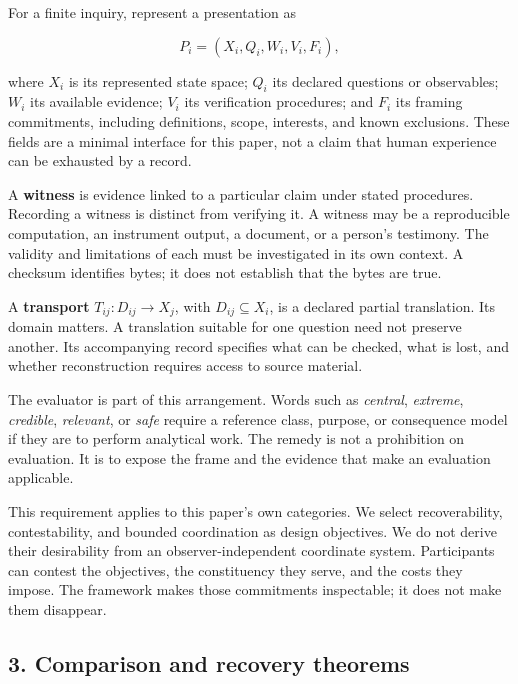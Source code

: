 \documentclass[
  10pt,
]{article}
\begin{document}
For a finite inquiry, represent a presentation as

\protect\hypertarget{math-E0005-0005}{}{\[
P_i=(X_i,Q_i,W_i,V_i,F_i),
\]}

where \protect\hypertarget{math-E0006-0006}{}{\(X_i\)} is its represented state space; \protect\hypertarget{math-E0007-0007}{}{\(Q_i\)} its declared questions or observables; \protect\hypertarget{math-E0008-0008}{}{\(W_i\)} its available evidence; \protect\hypertarget{math-E0009-0009}{}{\(V_i\)} its verification procedures; and \protect\hypertarget{math-E0010-0010}{}{\(F_i\)} its framing commitments, including definitions, scope, interests, and known exclusions. These fields are a minimal interface for this paper, not a claim that human experience can be exhausted by a record.

A \textbf{witness} is evidence linked to a particular claim under stated procedures. Recording a witness is distinct from verifying it. A witness may be a reproducible computation, an instrument output, a document, or a person's testimony. The validity and limitations of each must be investigated in its own context. A checksum identifies bytes; it does not establish that the bytes are true.

A \textbf{transport} \protect\hypertarget{math-E0011-0011}{}{\(T_{ij}:D_{ij}\to X_j\)}, with \protect\hypertarget{math-E0012-0012}{}{\(D_{ij}\subseteq X_i\)}, is a declared partial translation. Its domain matters. A translation suitable for one question need not preserve another. Its accompanying record specifies what can be checked, what is lost, and whether reconstruction requires access to source material.

The evaluator is part of this arrangement. Words such as \emph{central}, \emph{extreme}, \emph{credible}, \emph{relevant}, or \emph{safe} require a reference class, purpose, or consequence model if they are to perform analytical work. The remedy is not a prohibition on evaluation. It is to expose the frame and the evidence that make an evaluation applicable.

This requirement applies to this paper's own categories. We select recoverability, contestability, and bounded coordination as design objectives. We do not derive their desirability from an observer-independent coordinate system. Participants can contest the objectives, the constituency they serve, and the costs they impose. The framework makes those commitments inspectable; it does not make them disappear.

\subsection{3. Comparison and recovery theorems}\label{comparison-and-recovery-theorems}
\end{document}
